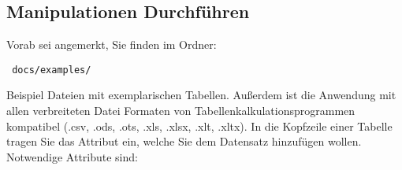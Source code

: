 \documentclass[a4paper,10pt]{scrartcl}
\begin{document}
     \subsection{Manipulationen Durchführen}
      Vorab sei angemerkt, Sie finden im Ordner:
      \begin{verbatim} docs/examples/  \end{verbatim}
      Beispiel Dateien mit exemplarischen Tabellen. \newline
      Außerdem ist die Anwendung mit allen verbreiteten Datei Formaten von Tabellenkalkulationsprogrammen kompatibel (.csv, .ods, .ots, .xls, .xlsx, .xlt, .xltx).      
      \newline
      \newline
      In die Kopfzeile einer Tabelle tragen Sie das Attribut ein, welche Sie dem Datensatz hinzufügen wollen. Notwendige Attribute sind:
\end{document}
